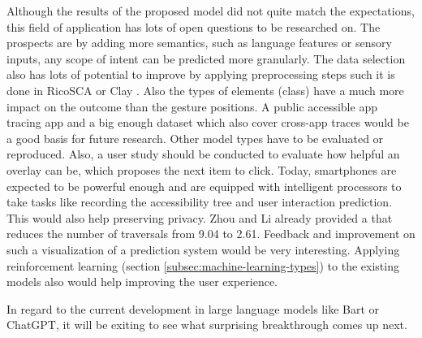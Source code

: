 Although the results of the proposed model did not quite match the expectations, this field of application has lots of open questions to be researched on.
The prospects are by adding more semantics, such as language features or sensory inputs, any scope of intent can be predicted more granularly.
The data selection also has lots of potential to improve by applying preprocessing steps such it is done in RicoSCA \cite{li2020mapping} or Clay \cite{clay}.
Also the types of elements (class) have a much more impact on the outcome than the gesture positions.
A public accessible app tracing app and a big enough dataset which also cover cross-app traces would be a good basis for future research.
Other model types have to be evaluated or reproduced.
Also, a user study should be conducted to evaluate how helpful an overlay can be, which proposes the next item to click.
Today, smartphones are expected to be powerful enough and are equipped with intelligent processors to take tasks like recording the accessibility tree and user interaction prediction.
This would also help preserving privacy.
Zhou and Li \cite{zhou2021large} already provided a  that reduces the number of traversals from 9.04 to 2.61.
Feedback and improvement on such a visualization of a prediction system would be very interesting.
Applying reinforcement learning (section \ref{subsec:machine-learning-types}) to the existing models also would help improving the user experience.


%

In regard to the current development in large language models like Bart or ChatGPT, it will be exiting to see what surprising breakthrough comes up next.
